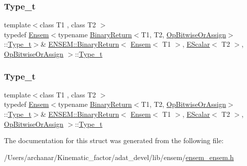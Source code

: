 \subsubsection{\texorpdfstring{Type\_t}{Type\_t}\hspace{0.1cm}{\footnotesize\ttfamily [1/2]}}
{\footnotesize\ttfamily template$<$class T1 , class T2 $>$ \\
typedef \mbox{\hyperlink{classENSEM_1_1Ensem}{Ensem}}$<$typename \mbox{\hyperlink{structENSEM_1_1BinaryReturn}{Binary\+Return}}$<$T1, T2, \mbox{\hyperlink{structENSEM_1_1OpBitwiseOrAssign}{Op\+Bitwise\+Or\+Assign}}$>$\+::\mbox{\hyperlink{structENSEM_1_1BinaryReturn_3_01Ensem_3_01T1_01_4_00_01EScalar_3_01T2_01_4_00_01OpBitwiseOrAssign_01_4_a0b1c32ed629f70fa44b15f9278b7703f}{Type\+\_\+t}}$>$\& \mbox{\hyperlink{structENSEM_1_1BinaryReturn}{E\+N\+S\+E\+M\+::\+Binary\+Return}}$<$ \mbox{\hyperlink{classENSEM_1_1Ensem}{Ensem}}$<$ T1 $>$, \mbox{\hyperlink{classENSEM_1_1EScalar}{E\+Scalar}}$<$ T2 $>$, \mbox{\hyperlink{structENSEM_1_1OpBitwiseOrAssign}{Op\+Bitwise\+Or\+Assign}} $>$\+::\mbox{\hyperlink{structENSEM_1_1BinaryReturn_3_01Ensem_3_01T1_01_4_00_01EScalar_3_01T2_01_4_00_01OpBitwiseOrAssign_01_4_a0b1c32ed629f70fa44b15f9278b7703f}{Type\+\_\+t}}}

\mbox{\label{structENSEM_1_1BinaryReturn_3_01Ensem_3_01T1_01_4_00_01EScalar_3_01T2_01_4_00_01OpBitwiseOrAssign_01_4_a0b1c32ed629f70fa44b15f9278b7703f}} 
\subsubsection{\texorpdfstring{Type\_t}{Type\_t}\hspace{0.1cm}{\footnotesize\ttfamily [2/2]}}
{\footnotesize\ttfamily template$<$class T1 , class T2 $>$ \\
typedef \mbox{\hyperlink{classENSEM_1_1Ensem}{Ensem}}$<$typename \mbox{\hyperlink{structENSEM_1_1BinaryReturn}{Binary\+Return}}$<$T1, T2, \mbox{\hyperlink{structENSEM_1_1OpBitwiseOrAssign}{Op\+Bitwise\+Or\+Assign}}$>$\+::\mbox{\hyperlink{structENSEM_1_1BinaryReturn_3_01Ensem_3_01T1_01_4_00_01EScalar_3_01T2_01_4_00_01OpBitwiseOrAssign_01_4_a0b1c32ed629f70fa44b15f9278b7703f}{Type\+\_\+t}}$>$\& \mbox{\hyperlink{structENSEM_1_1BinaryReturn}{E\+N\+S\+E\+M\+::\+Binary\+Return}}$<$ \mbox{\hyperlink{classENSEM_1_1Ensem}{Ensem}}$<$ T1 $>$, \mbox{\hyperlink{classENSEM_1_1EScalar}{E\+Scalar}}$<$ T2 $>$, \mbox{\hyperlink{structENSEM_1_1OpBitwiseOrAssign}{Op\+Bitwise\+Or\+Assign}} $>$\+::\mbox{\hyperlink{structENSEM_1_1BinaryReturn_3_01Ensem_3_01T1_01_4_00_01EScalar_3_01T2_01_4_00_01OpBitwiseOrAssign_01_4_a0b1c32ed629f70fa44b15f9278b7703f}{Type\+\_\+t}}}



The documentation for this struct was generated from the following file\+:\begin{DoxyCompactItemize}
\item 
/\+Users/archanar/\+Kinematic\+\_\+factor/adat\+\_\+devel/lib/ensem/\mbox{\hyperlink{lib_2ensem_2ensem__ensem_8h}{ensem\+\_\+ensem.\+h}}\end{DoxyCompactItemize}
